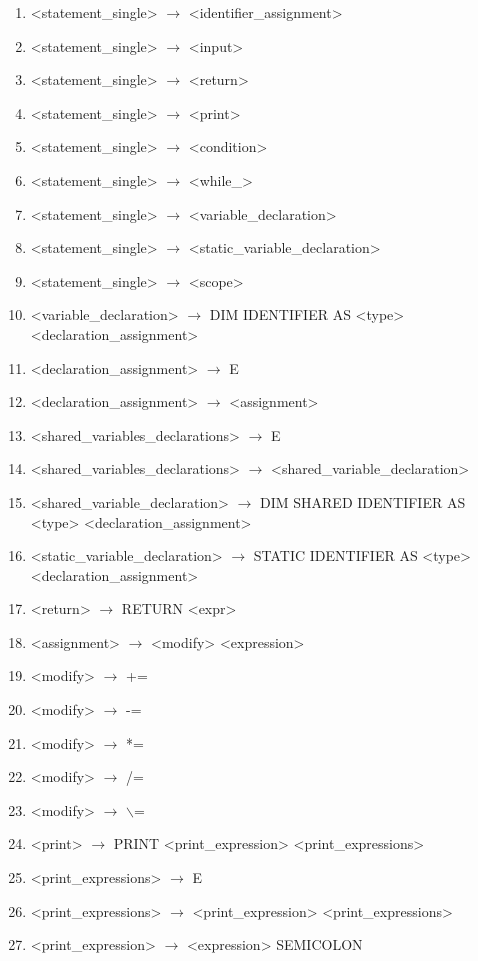 \begin{enumerate}
\item <statement\_single> $\rightarrow$ <identifier\_assignment>
\item <statement\_single> $\rightarrow$ <input>
\item <statement\_single> $\rightarrow$ <return>
\item <statement\_single> $\rightarrow$ <print>
\item <statement\_single> $\rightarrow$ <condition>
\item <statement\_single> $\rightarrow$ <while\_>
\item <statement\_single> $\rightarrow$ <variable\_declaration>
\item <statement\_single> $\rightarrow$ <static\_variable\_declaration>
\item <statement\_single> $\rightarrow$ <scope>

\item <variable\_declaration> $\rightarrow$ DIM IDENTIFIER AS <type> <declaration\_assignment>
\item <declaration\_assignment> $\rightarrow$ E
\item <declaration\_assignment> $\rightarrow$ <assignment>

\item <shared\_variables\_declarations> $\rightarrow$ E
\item <shared\_variables\_declarations> $\rightarrow$ <shared\_variable\_declaration>
\item <shared\_variable\_declaration> $\rightarrow$ DIM SHARED IDENTIFIER AS <type> <declaration\_assignment>

\item <static\_variable\_declaration> $\rightarrow$ STATIC IDENTIFIER AS <type> <declaration\_assignment>

\item <return> $\rightarrow$ RETURN <expr>

\item <assignment> $\rightarrow$ <modify> <expression>
\item <modify> $\rightarrow$ +=
\item <modify> $\rightarrow$ -=
\item <modify> $\rightarrow$ *=
\item <modify> $\rightarrow$ /=
\item <modify> $\rightarrow$ $\backslash$=

\item <print> $\rightarrow$ PRINT <print\_expression> <print\_expressions>
\item <print\_expressions> $\rightarrow$ E
\item <print\_expressions> $\rightarrow$ <print\_expression> <print\_expressions>
\item <print\_expression> $\rightarrow$ <expression> SEMICOLON


\end{enumerate}
